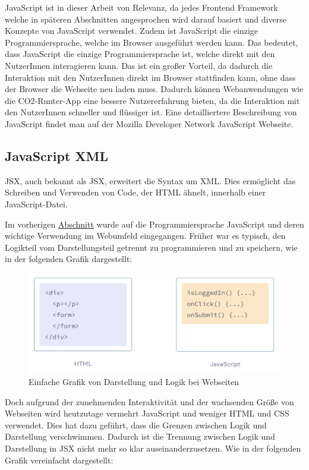 JavaScript ist in dieser Arbeit von Relevanz, da jedes Frontend Framework welche in späteren Abschnitten angesprochen wird darauf basiert und diverse Konzepte von JavaScript verwendet. Zudem ist JavaScript die einzige Programmiersprache, welche im Browser ausgeführt werden kann. Das bedeutet, dass JavaScript die einzige Programmiersprache ist, welche direkt mit den NutzerInnen interagieren kann. Das ist ein großer Vorteil, da dadurch die Interaktion mit den NutzerInnen direkt im Browser stattfinden kann, ohne dass der Browser die Webseite neu laden muss. Dadurch können Webanwendungen wie die CO2-Runter-App eine bessere Nutzererfahrung bieten, da die Interaktion mit den NutzerInnen schneller und flüssiger ist. Eine detailliertere Beschreibung von JavaScript findet man auf der Mozilla Developer Network JavaScript Webseite.\cite{javascript}

\subsection{JavaScript XML}

\acl{JSX}, auch bekannt als \acs{JSX}, erweitert die Syntax um \acf{XML}. Dies ermöglicht das Schreiben und Verwenden von Code, der \acs{HTML} ähnelt, innerhalb einer JavaScript-Datei.

Im vorherigen \hyperref[chapter:3-javaScript]{Abschnitt} wurde auf die Programmiersprache JavaScript und deren wichtige Verwendung im Webumfeld eingegangen. Früher war es typisch, den Logikteil vom Darstellungsteil getrennt zu programmieren und zu speichern, wie in der folgenden Grafik dargestellt:

\begin{figure}[h]
    \centering
    \includegraphics[width=1\textwidth]{images/02/ReactJS-JSX.jpeg}
    \caption{Einfache Grafik von Darstellung und Logik bei Webseiten\cite{react-jsx-html, react-jsx-javascript}}
\end{figure}

Doch aufgrund der zunehmenden Interaktivität und der wachsenden Größe von Webseiten wird heutzutage vermehrt JavaScript und weniger \acs{HTML} und \acs{CSS} verwendet. Dies hat dazu geführt, dass die Grenzen zwischen Logik und Darstellung verschwimmen. Dadurch ist die Trennung zwischen Logik und Darstellung in \acs{JSX} nicht mehr so klar auseinanderzusetzen. Wie in der folgenden Grafik vereinfacht dargestellt:


